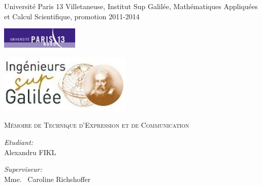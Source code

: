 \documentclass[a4paper,10pt]{report}
\begin{document}
\large

\begin{titlepage}
\begin{center}

{\large Universit\'{e} Paris 13 Villetaneuse, Institut Sup Galil\'{e}e, Math\'{e}matiques
Appliqu\'{e}es et Calcul Scientifique, promotion 2011-2014}\\[0.5cm]

\begin{minipage}{0.45\textwidth}
\begin{flushleft}

\includegraphics{img/paris_13_.jpeg}

\end{flushleft}
\end{minipage}
\begin{minipage}{0.45\textwidth}
\begin{flushright}

\includegraphics{img/sup_galilee.jpg}

\end{flushright}
\end{minipage}

\vfill
\textsc{\huge M\'emoire de Technique d'Expression et de Communication}\\[1.5cm]

\vfill

\begin{minipage}{0.45\textwidth}
\begin{flushleft}
\emph{Etudiant:}\\
Alexandru FIKL
\end{flushleft}
\end{minipage}
\begin{minipage}{0.45\textwidth}
\begin{flushright}
\emph{Superviseur:} \\
Mme. ~Caroline Richshoffer
\end{flushright}
\end{minipage}

\end{center}
\end{titlepage}
\end{document}
